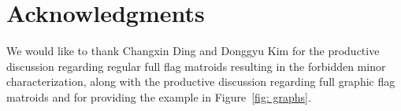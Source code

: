 \documentclass[12pt]{article}
\theoremstyle{definition}
\begin{document}
\section{Acknowledgments}
We would like to thank Changxin Ding and Donggyu Kim for the productive discussion regarding regular full flag matroids resulting in the forbidden minor characterization, along with the productive discussion regarding full graphic flag matroids and for providing the example in Figure~\ref{fig: graphs}.



\end{document}
